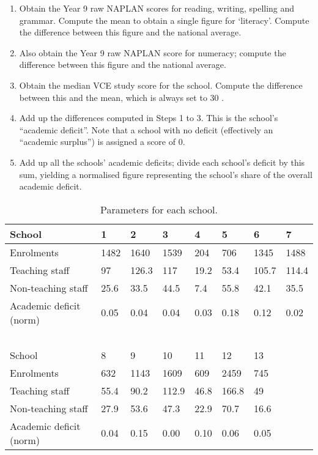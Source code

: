 \documentclass[11pt, a4paper]{article}
\begin{document}
    \begin{enumerate}
        \item Obtain the Year 9 raw NAPLAN scores for reading, writing, spelling and grammar. Compute the mean to obtain a single figure for `literacy'. Compute the difference between this figure and the national average. 
        \item Also obtain the Year 9 raw NAPLAN score for numeracy; compute the difference between this figure and the national average.
        \item Obtain the median VCE study score for the school. Compute the difference between this and the mean, which is always set to 30 \parencite{vce_info}.
        \item Add up the differences computed in Steps 1 to 3. This is the school's ``academic deficit''. Note that a school with no deficit (effectively an ``academic surplus'') is assigned a score of 0.
        \item Add up all the schools' academic deficits; divide each school's deficit by this sum, yielding a normalised figure representing the school's share of the overall academic deficit.
    \end{enumerate}

    \begin{table}[!ht]
        \centering
        \caption{Parameters for each school.}
        \begin{tabular}{|l|l|l|l|l|l|l|l|}
            \hline
                School & 1 & 2 & 3 & 4 & 5 & 6 & 7 \\ \hline
                Enrolments & 1482 & 1640 & 1539 & 204 & 706 & 1345 & 1488 \\ \hline
                Teaching staff & 97 & 126.3 & 117 & 19.2 & 53.4 & 105.7 & 114.4 \\ \hline
                Non-teaching staff & 25.6 & 33.5 & 44.5 & 7.4 & 55.8 & 42.1 & 35.5 \\ \hline
                Academic deficit (norm) & 0.05 & 0.04 & 0.04 & 0.03 & 0.18 & 0.12 & 0.02 \\ \hline
                ~ & ~ & ~ & ~ & ~ & ~ & ~ & ~ \\ \hline
                School & 8 & 9 & 10 & 11 & 12 & 13 & ~ \\ \hline
                Enrolments & 632 & 1143 & 1609 & 609 & 2459 & 745 & ~ \\ \hline
                Teaching staff & 55.4 & 90.2 & 112.9 & 46.8 & 166.8 & 49 & ~ \\ \hline
                Non-teaching staff & 27.9 & 53.6 & 47.3 & 22.9 & 70.7 & 16.6 & ~ \\ \hline
                Academic deficit (norm) & 0.04 & 0.15 & 0.00 & 0.10 & 0.06 & 0.05 & ~ \\ \hline
        \end{tabular}
        \label{params}
    \end{table}
\end{document}
